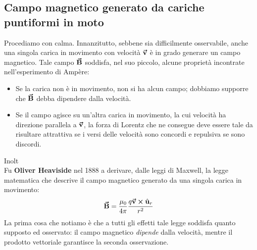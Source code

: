 \subsection{Campo magnetico generato da cariche puntiformi in moto}
Procediamo con calma. Innanzitutto, sebbene sia difficilmente osservabile, anche una singola carica in movimento con velocità $\vb*{\va{v}}$ è in grado generare un campo magnetico. Tale campo $\vb*{\va{B}}$ soddisfa, nel suo piccolo, alcune proprietà incontrate nell'esperimento di Ampère:
\begin{itemize}
	\item Se la carica non è in movimento, non si ha alcun campo; dobbiamo supporre che $\vb*{\va{B}}$ debba dipendere dalla velocità.
	\item Se il campo agisce su un'altra carica in movimento, la cui velocità ha direzione parallela a $\vb*{\va{v}}$, la forza di Lorentz che ne consegue deve essere tale da risultare attrattiva se i versi delle velocità sono concordi e repulsiva se sono discordi. 
\end{itemize}   Inolt \\
Fu \textbf{Oliver Heaviside} nel 1888 a derivare, dalle leggi di Maxwell, la legge matematica che descrive il campo magnetico generato da una singola carica in movimento:
\begin{equation}
	\vb*{\va{B}}=\frac{\mu_0}{4\pi}\frac{q\vb*{\va{v}}\cross\hat{\mathbf{u}}_r}{r^2}
\end{equation}
La prima cosa che notiamo è che a tutti gli effetti tale legge soddisfa quanto supposto ed osservato: il campo magnetico \textit{dipende} dalla velocità, mentre il prodotto vettoriale garantisce la seconda osservazione.

